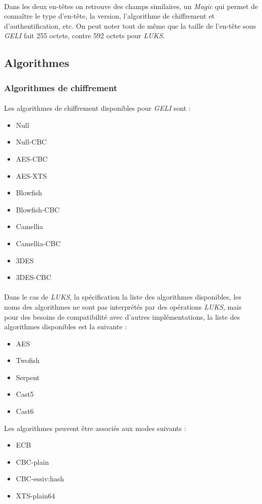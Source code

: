\paragraph{}
Dans les deux en-têtes on retrouve des champs similaires, un {\em Magic} qui 
permet de connaître le type d'en-tête, la version, l'algorithme de chiffrement 
et d'authentification, etc. On peut noter tout de même que la taille de 
l'en-tête sous {\em GELI} fait 255 octets, contre 592 octets pour {\em LUKS}.



\subsection{Algorithmes}
\subsubsection{Algorithmes de chiffrement}
\paragraph{}
Les algorithmes de chiffrement disponibles pour {\em GELI} \cite{geli.h} sont :
\begin{itemize}
	\item Null
	\item Null-CBC
	\item AES-CBC
	\item AES-XTS
	\item Blowfish
	\item Blowfish-CBC
	\item Camellia
	\item Camellia-CBC
	\item 3DES
	\item 3DES-CBC
\end{itemize}

\paragraph{}
Dans le cas de {\em LUKS}, la spécification \cite{onDiskFormatLuks}
la liste des algorithmes disponibles, les noms des algorithmes ne sont pas 
interprétés par des opérations {\em LUKS}, mais pour des besoins de 
compatibilité avec d'autres implémentations, la liste des algorithmes 
disponibles est la suivante :
\begin{itemize}
	\item AES
	\item Twofish
	\item Serpent
	\item Cast5
	\item Cast6
\end{itemize}
Les algorithmes peuvent être associés aux modes suivants :
\begin{itemize}
	\item ECB
	\item CBC-plain
	\item CBC-essiv:hash
	\item XTS-plain64
\end{itemize}

